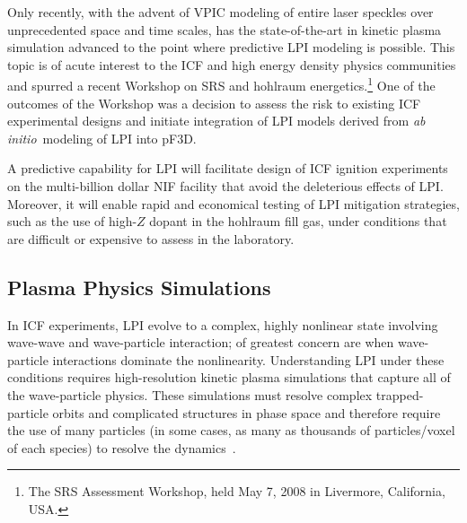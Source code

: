 \documentclass[journal,twoside]{IEEEtran}
\newcommand{\abinitio} {\textit{ab initio}}
\begin{document}
Only recently, with the advent of VPIC modeling of entire laser
speckles over unprecedented space and time scales, has the
state-of-the-art in kinetic plasma simulation advanced to the point
where predictive LPI modeling is possible.  This topic is of acute
interest to the ICF and high energy density physics communities and
spurred a recent Workshop on SRS and hohlraum energetics.\footnote{The
SRS Assessment Workshop, held May 7, 2008 in Livermore, California,
USA.}  One of the outcomes of the Workshop was a decision to assess
the risk to existing ICF experimental designs and initiate integration
of LPI models derived from \abinitio\ modeling of LPI into pF3D.

A predictive capability for LPI will facilitate design of ICF ignition
experiments on the multi-billion dollar NIF facility that avoid the
deleterious effects of LPI.  Moreover, it will enable rapid and
economical testing of LPI mitigation strategies, such as the use of
high-$Z$ dopant in the hohlraum fill gas, under conditions that are
difficult or expensive to assess in the laboratory.

\subsection{Plasma Physics Simulations}

In ICF experiments, LPI evolve to a complex, highly nonlinear state
involving wave-wave and wave-particle interaction; of greatest concern
are when wave-particle interactions dominate the nonlinearity.
Understanding LPI under these conditions requires high-resolution
kinetic plasma simulations that capture all of the wave-particle
physics.  These simulations must resolve complex trapped-particle
orbits and complicated structures in phase space and therefore require
the use of many particles (in some cases, as many as thousands of
particles/voxel of each species) to resolve the
dynamics~\cite{Yin_et_al_Phys_Plasmas_2006}.
\end{document}
